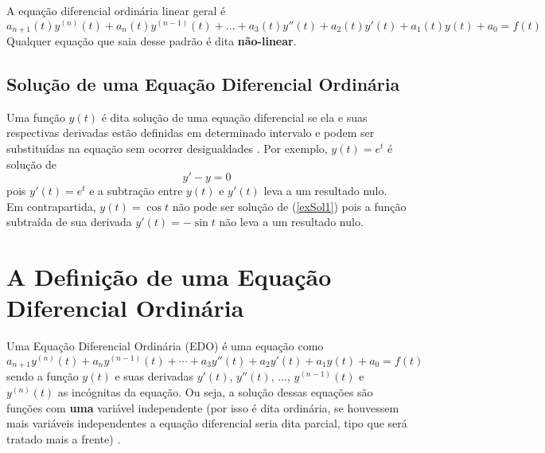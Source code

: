             A equação
            diferencial ordinária linear geral é
            \begin{equation}
                a_{n+1}(t)y^{(n)}(t) + a_{n}(t)y^{(n-1)}(t) + ... + a_{3}(t)y''(t) 
                + a_{2}(t)y'(t) + a_{1}(t)y(t) + a_{0} = f(t)
            \end{equation}
            Qualquer equação que saia desse padrão é dita \textbf{não-linear}.

        \subsection{Solução de uma Equação Diferencial Ordinária}

            Uma função $y(t)$ é dita solução de uma equação diferencial 
            se ela e suas respectivas derivadas estão definidas em determinado intervalo e 
            podem ser substituídas na equação sem ocorrer desigualdades \cite{regiIntro}. 
            Por exemplo, $y(t) = e^t$ é solução de
            \begin{equation}
                \label{exSol1}
                y' - y = 0
            \end{equation}
            pois $y'(t) = e^t$ e a subtração entre $y(t)$ e $y'(t)$ leva a um resultado nulo. 
            Em contrapartida, $y(t) = \cos{t}$ não pode ser solução de (\ref{exSol1}) pois a 
            função subtraída de sua derivada $y'(t) = -\sin{t}$ não leva a um resultado nulo.
    
    
    \section{A Definição de uma Equação Diferencial Ordinária}

        \label{defEDO}
        Uma Equação Diferencial Ordinária (EDO) é uma equação como
        \begin{equation}
            \label{EDOgeral}
            a_{n+1}y^{(n)}(t) + a_{n}y^{(n-1)}(t) + \cdots + a_{3}y''(t) + a_{2}y'(t) + a_{1}y(t) + a_{0} = f(t)
        \end{equation}
        sendo a função \(y(t)\) e suas derivadas \(y'(t)\), \(y''(t)\), ...,
        \(y^{(n-1)}(t)\) e \(y^{(n)}(t)\) as incógnitas da equação. Ou seja, a
        solução dessas equações são funções com \textbf{uma} variável
        independente (por isso é dita ordinária, se houvessem mais variáveis
        independentes a equação diferencial seria dita parcial, tipo que será
        tratado mais a frente) \cite{boyce9, regiIntro}.
    
